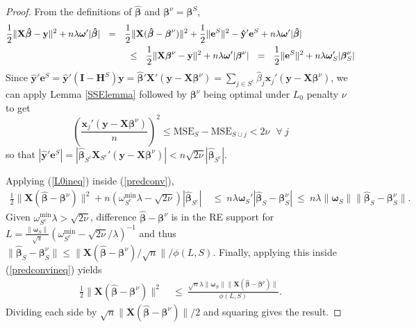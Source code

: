 \documentclass[12pt]{article}
\newcommand{\bs}[1]{\boldsymbol{#1}}
\newcommand{\mr}[1]{\mathrm{#1}}
\newcommand{\bm}[1]{\mathbf{#1}}
\begin{document}
\begin{proof}
From the definitions of $\bs{\hat\beta}$ and $\bs{\beta}^\nu = \bs{\beta}^S$, 
\begin{align}\label{predconv}
\frac{1}{2}\|\bm{X}\bs{\hat \beta}-\bm{y}\|^2 + n\lambda\bs{\omega}'|\bs{\hat\beta}| & ~~=~~ \frac{1}{2}\|\bm{X}(\bs{\hat\beta}-\bs{\beta}^\nu)\|^2 + \frac{1}{2}\|\bm{e}^S\|^2 - \bm{\hat y}'\bm{e}^S+ n\lambda\bs{\omega}'|\bs{\hat\beta}|\\
& ~~~~~~~~~\leq~~ \frac{1}{2}\|\bm{X}\bs{\beta}^\nu-\bm{y}\|^2 + n\lambda\bs{\omega}'|\bs{\beta}^\nu| ~~=~~ \frac{1}{2}\|\bm{e}^S\|^2 + n\lambda\bs{\omega}_S'|\bs{\beta}^\nu_S|\notag
\end{align}
  Since $\bm{\hat y}'\bm{e}^S = \bm{\hat y}'(\bm{I}-\bm{H}^S)\bm{y} =
\bs{\hat\beta}'\bm{X}'(\bm{y}-\bm{X}\bs{\beta}^\nu) = 
\sum_{j\in S^c} \hat\beta_j\bs{x}_j'(\bm{y}-\bm{X}\bs{\beta}^\nu)
$,
 we can apply Lemma \ref{SSElemma} followed by $\bs{\beta}^\nu$ being optimal under $L_0$ penalty $\nu$ to get 
\begin{equation} \label{L0ineq}
\left(\frac{\bs{x}_j'(\bm{y}-\bm{X}\bs{\beta}^\nu)}{n}\right)^2
\leq \mr{MSE}_S - \mr{MSE}_{S\cup j} < 2\nu ~~~\forall~j
\end{equation}
so that $|\bm{\hat y}'\bm{e}^S| = |\bs{\hat\beta}_{S^c}\bm{X}_{S^c}'(\bm{y}-\bm{X}\bs{\beta}^\nu)| < n\sqrt{2\nu}|\bs{\hat\beta}_{S^c}|$.

Applying (\ref{L0ineq}) inside (\ref{predconv}),
\begin{align}\label{predconvineq}
\frac{1}{2}\|\bm{X}(\bs{\hat\beta}-\bs{\beta}^\nu)\|^2
  + n\left(\omega^{\mr{min}}_{S^c}\lambda-\sqrt{2\nu}\right)|\bs{\hat\beta}_{S^c}|
  &~\leq~ n\lambda\bs{\omega}_{S}'|\bs{\hat\beta}_{S}-\bs{\beta}^\nu_S|
  ~\leq~ n\lambda\|\bs{\omega}_S\|\|\bs{\hat\beta}_{S}-\bs{\beta}^\nu_S\|.
\end{align}
Given $\omega^{\mr{min}}_{S^c}\lambda > \sqrt{2\nu}$,
difference $\bs{\hat\beta}-\bs{\beta}^\nu$ is in the RE support for 
$L=\frac{\|\bs{\omega}_S\|}{\sqrt{s}}(\omega^{\mr{min}}_{S^c}-\sqrt{2\nu}/\lambda)^{-1}$ and thus $\|\bs{\hat\beta}_{S}-\bs{\beta}^\nu_S\| \leq \|\bm{X}(\bs{\hat\beta}-\bs{\beta}^\nu)/\sqrt{n}\|/\phi(L,S)$.  Finally, applying this inside (\ref{predconvineq}) yields
\begin{align}
\frac{1}{2}\|\bm{X}(\bs{\hat\beta}-\bs{\beta}^\nu)\|^2
  &~\leq~ \frac{\sqrt{n}\lambda\|\bs{\omega}_S\|\|\bm{X}(\bs{\hat\beta}-\bs{\beta}^\nu)\|}
  {\phi(L, S)}.
\end{align}
Dividing each side by $\sqrt{n}\|\bm{X}(\bs{\hat\beta}-\bs{\beta}^\nu)\|/2$ and squaring gives the result.
\end{proof}
\end{document}
